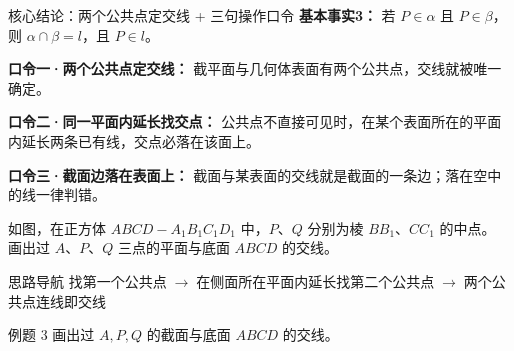 \documentclass{exam-zh}
\begin{document}
\begin{eduSolutionBox}{核心结论：两个公共点定交线 + 三句操作口令}
  \begingroup
  \setlength{\parskip}{2.5mm}
\textbf{基本事实3：} 若 $P\in\alpha$ 且 $P\in\beta$，则 $\alpha\cap\beta=l$，且 $P\in l$。\par
\textbf{口令一·两个公共点定交线：} 截平面与几何体表面有两个公共点，交线就被唯一确定。\par
\textbf{口令二·同一平面内延长找交点：} 公共点不直接可见时，在某个表面所在的平面内延长两条已有线，交点必落在该面上。\par
\textbf{口令三·截面边落在表面上：} 截面与某表面的交线就是截面的一条边；落在空中的线一律判错。\par
  \endgroup
\end{eduSolutionBox}




\begin{eduProblemBlock}[例题 3]
\noindent
\begin{minipage}[t]{\dimexpr\linewidth-70mm-6mm\relax}
\vspace{0pt}
如图，在正方体 $ABCD-A_1B_1C_1D_1$ 中，$P$、$Q$ 分别为棱 $BB_1$、$CC_1$ 的中点。
画出过 $A$、$P$、$Q$ 三点的平面与底面 $ABCD$ 的交线。

\end{minipage}\hfill
\begin{diagramcoltikz}{70mm}{原题图：看清 $A$ 与中点 $P,Q$。}
}
\end{diagramcoltikz}
\end{eduProblemBlock}





\begin{eduAuxItem}{思路导航}
找第一个公共点$\;\to\;$在侧面所在平面内延长找第二个公共点$\;\to\;$两个公共点连线即交线\end{eduAuxItem}




\begin{eduSubQuestionItem}{例题 3}
画出过 $A,P,Q$ 的截面与底面 $ABCD$ 的交线。\end{eduSubQuestionItem}
\end{document}
